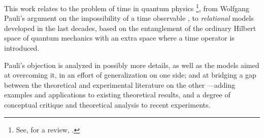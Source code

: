 This work relates to the problem of time in quantum physics%
\footnote{
  See, for a review, \cite{TQM1, TQM2}.
},
from Wolfgang Pauli's argument
on the impossibility of a time observable \parencite{PauliFootnote},
to \emph{relational} models developed in the last decades,
based
on the entanglement of the ordinary Hilbert space of quantum mechanics
with an extra space where a time operator is introduced.

Pauli's objection is analyzed in possibly more details, as well as the models
aimed at overcoming it, in an effort of generalization on one side;
and at bridging a gap between the theoretical
and experimental literature on the other
---adding examples and applications to existing theoretical results,
and a degree of conceptual critique and theoretical analysis
to recent experiments.
